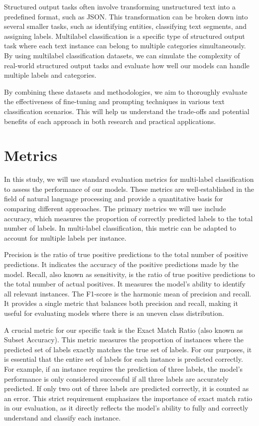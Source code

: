 \documentclass[11pt]{article}
\begin{document}
Structured output tasks often involve transforming unstructured text into a predefined format, such as JSON. This transformation can be broken down into several smaller tasks, such as identifying entities, classifying text segments, and assigning labels. Multilabel classification is a specific type of structured output task where each text instance can belong to multiple categories simultaneously. By using multilabel classification datasets, we can simulate the complexity of real-world structured output tasks and evaluate how well our models can handle multiple labels and categories.

By combining these datasets and methodologies, we aim to thoroughly evaluate the effectiveness of fine-tuning and prompting techniques in various text classification scenarios. This will help us understand the trade-offs and potential benefits of each approach in both research and practical applications.

\section{Metrics} 

In this study, we will use standard evaluation metrics for multi-label classification to assess the performance of our models. These metrics are well-established in the field of natural language processing and provide a quantitative basis for comparing different approaches. The primary metrics we will use include accuracy, which measures the proportion of correctly predicted labels to the total number of labels. In multi-label classification, this metric can be adapted to account for multiple labels per instance.

Precision is the ratio of true positive predictions to the total number of positive predictions. It indicates the accuracy of the positive predictions made by the model. Recall, also known as sensitivity, is the ratio of true positive predictions to the total number of actual positives. It measures the model’s ability to identify all relevant instances. The F1-score is the harmonic mean of precision and recall. It provides a single metric that balances both precision and recall, making it useful for evaluating models where there is an uneven class distribution.

A crucial metric for our specific task is the Exact Match Ratio (also known as Subset Accuracy). This metric measures the proportion of instances where the predicted set of labels exactly matches the true set of labels. For our purposes, it is essential that the entire set of labels for each instance is predicted correctly. For example, if an instance requires the prediction of three labels, the model’s performance is only considered successful if all three labels are accurately predicted. If only two out of three labels are predicted correctly, it is counted as an error. This strict requirement emphasizes the importance of exact match ratio in our evaluation, as it directly reflects the model’s ability to fully and correctly understand and classify each instance.
\end{document}
